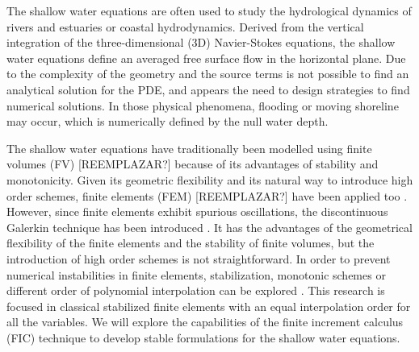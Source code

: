 \documentclass[a4paper,12pt]{article}
\newcommand\IgnasiCorregit[1]{\ifthenelse{\boolean{show_corregit}}{\textcolor{blue}{#1}}{}}
\begin{document}
The shallow water equations are often used to study the hydrological dynamics of rivers and estuaries or coastal hydrodynamics.
Derived from the vertical integration of the three-dimensional (3D) Navier-Stokes equations, the shallow water equations define an averaged free surface flow in the horizontal plane.
Due to the complexity of the geometry and the source terms is not possible to find an analytical solution for the PDE, and appears the need to design strategies to find numerical solutions.
In those physical phenomena, flooding or moving shoreline may occur, which is numerically defined by the null water depth.

The shallow water equations have traditionally been modelled using finite volumes (FV) [REEMPLAZAR?] because of its advantages of stability and monotonicity. Given its geometric flexibility and its natural way to introduce high order schemes, finite elements (FEM) [REEMPLAZAR?] have been applied too \cite{zien3,navon1979,navon1988}.
However, since finite elements exhibit spurious oscillations, the discontinuous Galerkin technique has been introduced \cite{ambati2007,khan2014,lee2019}.
It has the advantages of the geometrical flexibility of the finite elements and the stability of finite volumes, but the introduction of high order schemes is not straightforward.
In order to prevent numerical instabilities in finite elements, stabilization, monotonic schemes or different order of polynomial interpolation can be explored \cite{hood1974,zien3,ortiz2012}.
This research is focused in classical stabilized finite elements with an equal interpolation order for all the variables. We will explore the capabilities of the finite increment calculus (FIC) technique to develop stable formulations for the shallow water equations.
\end{document}
